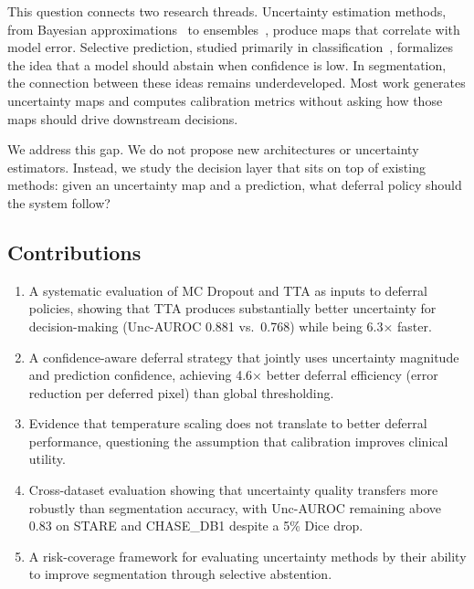 \documentclass[journal]{IEEEtran}
\begin{document}
This question connects two research threads. Uncertainty estimation methods,
from Bayesian approximations~\cite{gal2016dropout} to ensembles~\cite{lakshminarayanan2017simple},
produce maps that correlate with model error. Selective prediction, studied
primarily in classification~\cite{geifman2017selective,el2010foundations},
formalizes the idea that a model should abstain when confidence is low. In
segmentation, the connection between these ideas remains underdeveloped. Most
work generates uncertainty maps and computes calibration metrics without asking
how those maps should drive downstream decisions.

We address this gap. We do not propose new architectures or uncertainty
estimators. Instead, we study the decision layer that sits on top of existing
methods: given an uncertainty map and a prediction, what deferral policy should
the system follow?

\subsection{Contributions}

\begin{enumerate}
\item A systematic evaluation of MC Dropout and TTA as inputs to deferral
policies, showing that TTA produces substantially better uncertainty for
decision-making (Unc-AUROC 0.881 vs.\ 0.768) while being 6.3$\times$ faster.

\item A confidence-aware deferral strategy that jointly uses uncertainty
magnitude and prediction confidence, achieving 4.6$\times$ better deferral
efficiency (error reduction per deferred pixel) than global thresholding.

\item Evidence that temperature scaling does not translate to better deferral
performance, questioning the assumption that calibration improves clinical
utility.

\item Cross-dataset evaluation showing that uncertainty quality transfers more
robustly than segmentation accuracy, with Unc-AUROC remaining above 0.83 on
STARE and CHASE\_DB1 despite a 5\% Dice drop.

\item A risk-coverage framework for evaluating uncertainty methods by their
ability to improve segmentation through selective abstention.
\end{enumerate}
\end{document}
